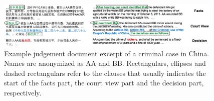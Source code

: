 

\begin{figure}[t!]
\begin{center}
\includegraphics[width=0.97\textwidth]{figures/case.png}	
\caption{Example judgement document excerpt of a criminal case in China. Names are anonymized as AA and BB.
Rectangulars, ellipses and dashed rectangulars refer to the clauses that usually indicates the start of the facts part, the court view part and the decision part, respectively.
}
\label{fig_example_case}
\end{center}
\end{figure}
